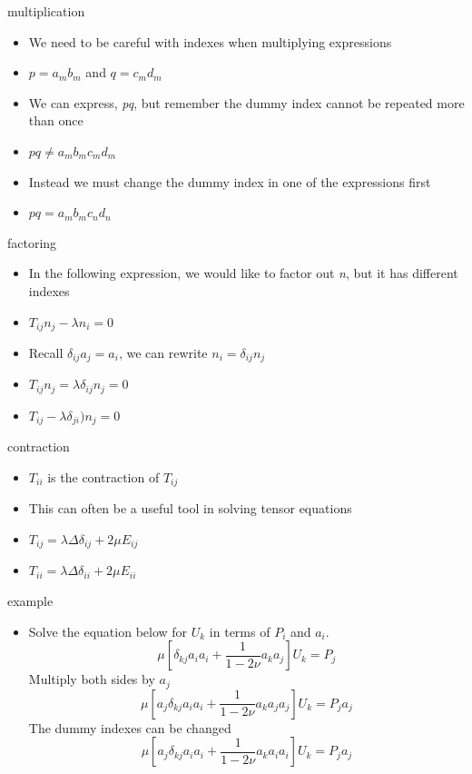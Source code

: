 \documentclass[
  letterpaper,
  ignorenonframetext,
  aspectratio=43,
  handout,
  12pt]{beamer}
\providecommand{\tightlist}{%
  \setlength{\itemsep}{0pt}\setlength{\parskip}{0pt}}
\providecommand{\tightlist}{%
\setlength{\itemsep}{0pt}\setlength{\parskip}{0pt}}
\begin{document}
\begin{frame}{multiplication}
\protect\hypertarget{multiplication}{}
\begin{itemize}
\tightlist
\item
  We need to be careful with indexes when multiplying expressions
\item
  \(p = a_m b_m\) and \(q = c_m d_m\)
\item
  We can express, \emph{pq}, but remember the dummy index cannot be
  repeated more than once
\item
  \(pq \ne a_m b_m c_m d_m\)
\item
  Instead we must change the dummy index in one of the expressions first
\item
  \(pq = a_m b_m c_n d_n\)
\end{itemize}
\end{frame}

\begin{frame}{factoring}
\protect\hypertarget{factoring}{}
\begin{itemize}
\tightlist
\item
  In the following expression, we would like to factor out \emph{n}, but
  it has different indexes
\item
  \(T_{ij}n_j - \lambda n_i = 0\)
\item
  Recall \(\delta_{ij}a_j = a_i\), we can rewrite
  \(n_i = \delta_{ij}n_j\)
\item
  \(T_{ij}n_j = \lambda \delta_{ij}n_j = 0\)
\item
  \(T_{ij} - \lambda \delta_{ji})n_j = 0\)
\end{itemize}
\end{frame}

\begin{frame}{contraction}
\protect\hypertarget{contraction}{}
\begin{itemize}
\tightlist
\item
  \(T_{ii}\) is the contraction of \(T_{ij}\)
\item
  This can often be a useful tool in solving tensor equations
\item
  \(T_{ij} = \lambda \Delta \delta_{ij} + 2\mu E_{ij}\)
\item
  \(T_{ii} = \lambda \Delta \delta_{ii} + 2\mu E_{ii}\)
\end{itemize}
\end{frame}

\begin{frame}{example}
\protect\hypertarget{example-1}{}
\begin{itemize}
\tightlist
\item
  Solve the equation below for \(U_k\) in terms of \(P_i\) and \(a_i\).
  \[\mu \left[ \delta_{kj} a_i a_i + \frac{1}{1-2\nu} a_k a_j \right] U_k = P_j\]
  Multiply both sides by \(a_j\)
  \[\mu \left[ a_j \delta_{kj} a_i a_i + \frac{1}{1-2\nu} a_k a_j a_j \right] U_k = P_j a_j\]
  The dummy indexes can be changed
  \[\mu \left[ a_j \delta_{kj} a_i a_i + \frac{1}{1-2\nu} a_k a_i a_i \right] U_k = P_j a_j\]
\end{itemize}
\end{frame}
\end{document}
